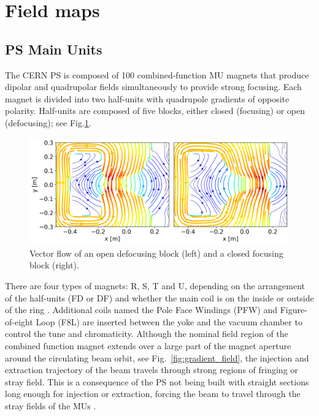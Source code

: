 \documentclass[a4paper,
               biblatex,     %
               keeplastbox,   %
               ]{jacow}
\begin{document}
\section{Field maps}
\subsection{PS Main Units}
The CERN PS is composed of 100 combined-function MU magnets that produce dipolar and quadrupolar fields simultaneously to provide strong focusing. Each magnet is divided into two half-units with quadrupole gradients of opposite polarity. Half-units are composed of five blocks, either closed (focusing) or open (defocusing); see Fig.\ref{fig:streamplot}.

\begin{figure}[!htb]
   \centering
   \includegraphics*[width=1.0\columnwidth]{MOPOTK030_f1.png}
   \caption{Vector flow of an open defocusing block (left) and a closed focusing block (right).}
   \label{fig:streamplot}
\end{figure}

There are four types of magnets: R, S, T and U, depending on the arrangement of the half-units (FD or DF) and whether the main coil is on the inside or outside of the ring \cite{steerenberg_fifty_2011}. Additional coils named the Pole Face Windings (PFW) and Figure-of-eight Loop (F8L) are inserted between the yoke and the vacuum chamber to control the tune and chromaticity. Although the nominal field region of the combined function magnet extends over a large part of the magnet aperture around the circulating beam orbit, see Fig.~\ref{fig:gradient_field}, the injection and extraction trajectory of the beam travels through strong regions of fringing or stray field. This is a consequence of the PS not being built with straight sections long enough for injection or extraction, forcing the beam to travel through the stray fields of the MUs \cite{risselada_beam_nodate}.
\end{document}
